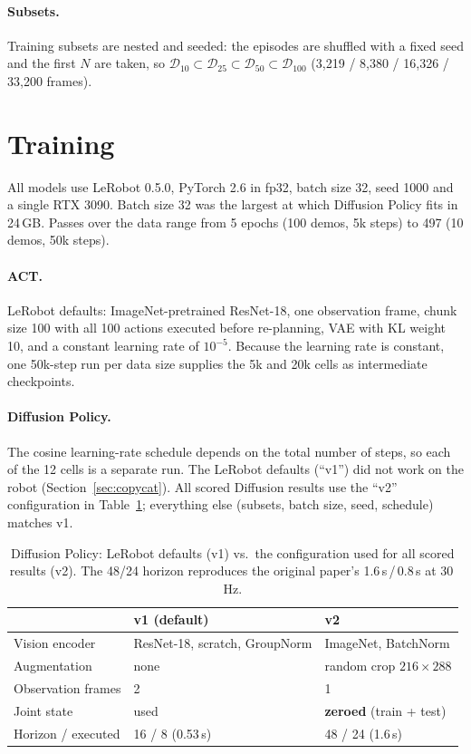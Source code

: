 \documentclass[10pt,twocolumn,letterpaper]{article}
\begin{document}
\paragraph{Subsets.} Training subsets are nested and seeded: the episodes are shuffled with a
fixed seed and the first $N$ are taken, so $\mathcal{D}_{10}\subset\mathcal{D}_{25}\subset
\mathcal{D}_{50}\subset\mathcal{D}_{100}$ (3{,}219 / 8{,}380 / 16{,}326 / 33{,}200 frames).

\section{Training}

All models use LeRobot 0.5.0, PyTorch 2.6 in fp32, batch size 32, seed 1000 and a single RTX 3090.
Batch size 32 was the largest at which Diffusion Policy fits in 24\,GB. Passes over the data range
from 5 epochs (100 demos, 5k steps) to 497 (10 demos, 50k steps).

\paragraph{ACT.} LeRobot defaults: ImageNet-pretrained ResNet-18, one observation frame, chunk
size 100 with all 100 actions executed before re-planning, VAE with KL weight 10, and a constant
learning rate of $10^{-5}$. Because the learning rate is constant, one 50k-step run per data size
supplies the 5k and 20k cells as intermediate checkpoints.

\paragraph{Diffusion Policy.} The cosine learning-rate schedule depends on the total number of
steps, so each of the 12 cells is a separate run. The LeRobot defaults (``v1'') did not work on
the robot (Section~\ref{sec:copycat}). All scored Diffusion results use the ``v2'' configuration
in Table~\ref{tab:v2}; everything else (subsets, batch size, seed, schedule) matches v1.

\begin{table}[t]
  \centering\small
  \caption{Diffusion Policy: LeRobot defaults (v1) vs.\ the configuration used for all scored
  results (v2). The 48/24 horizon reproduces the original paper's 1.6\,s\,/\,0.8\,s at 30\,Hz.}
  \label{tab:v2}
  \footnotesize\setlength{\tabcolsep}{4pt}
  \begin{tabular}{@{}lll@{}}
    \toprule
    & v1 (default) & v2 \\
    \midrule
    Vision encoder & ResNet-18, scratch, GroupNorm & ImageNet, BatchNorm \\
    Augmentation & none & random crop $216\times288$ \\
    Observation frames & 2 & 1 \\
    Joint state & used & \textbf{zeroed} (train + test) \\
    Horizon / executed & 16 / 8 (0.53\,s) & 48 / 24 (1.6\,s) \\
    \bottomrule
  \end{tabular}
\end{table}
\end{document}
